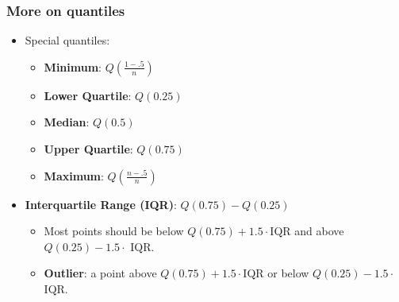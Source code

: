 \documentclass[handout]{beamer}
\numberwithin{equation}{section}
\begin{document}
\begin{frame}
\frametitle{More on quantiles}

\begin{itemize}
\item Special quantiles:
\begin{itemize}
\item {\bf Minimum}: $Q\left ( \frac{1 - .5}{n}\right)$
\pause \item {\bf Lower Quartile}: $Q(0.25)$
\pause \item {\bf Median}: $Q(0.5)$
\pause \item {\bf Upper Quartile}: $Q(0.75)$
\pause \item {\bf Maximum}: $Q\left ( \frac{n - .5}{n} \right ) $
\end{itemize}
\pause \item {\bf Interquartile Range (IQR)}: $Q(0.75) - Q(0.25)$
\begin{itemize}
\pause \item Most points should be below $Q(0.75) + 1.5 \cdot $IQR and above $Q(0.25) - 1.5 \cdot$ IQR.
\item {\bf Outlier}: a point above $Q(0.75) + 1.5 \cdot $IQR or below $Q(0.25) - 1.5 \cdot$ IQR.
\end{itemize}
\end{itemize}
\end{frame}

\end{document}
